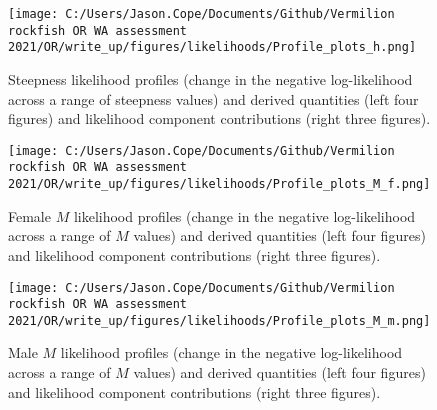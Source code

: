 \documentclass[11pt,
  english,
  a4paper,
]{article}
\begin{document}

\begin{figure}
\centering
\texttt{[image: C:/Users/Jason.Cope/Documents/Github/Vermilion rockfish OR WA assessment 2021/OR/write\_up/figures/likelihoods/Profile\_plots\_h.png]}
\caption{Steepness likelihood profiles (change in the negative log-likelihood across a range of steepness values) and derived quantities (left four figures) and likelihood component contributions (right three figures).\label{fig:steepness-profile-combo}}
\end{figure}

\tagmcend\tagstructend


\begin{figure}
\centering
\texttt{[image: C:/Users/Jason.Cope/Documents/Github/Vermilion rockfish OR WA assessment 2021/OR/write\_up/figures/likelihoods/Profile\_plots\_M\_f.png]}
\caption{Female {\(M\)\leavevmode\tagmcend\tagstructend} likelihood profiles (change in the negative log-likelihood across a range of {\(M\)\leavevmode\tagmcend\tagstructend} values) and derived quantities (left four figures) and likelihood component contributions (right three figures).\label{fig:M_f-profile-combo}}
\end{figure}

\tagmcend\tagstructend


\begin{figure}
\centering
\texttt{[image: C:/Users/Jason.Cope/Documents/Github/Vermilion rockfish OR WA assessment 2021/OR/write\_up/figures/likelihoods/Profile\_plots\_M\_m.png]}
\caption{Male {\(M\)\leavevmode\tagmcend\tagstructend} likelihood profiles (change in the negative log-likelihood across a range of {\(M\)\leavevmode\tagmcend\tagstructend} values) and derived quantities (left four figures) and likelihood component contributions (right three figures).\label{fig:M_m-profile-combo}}
\end{figure}
\end{document}
